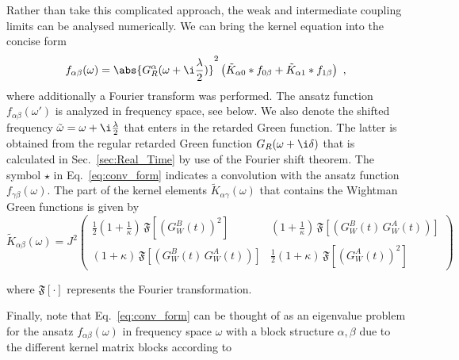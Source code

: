 Rather than take this complicated approach, the weak and intermediate coupling limits can be analysed numerically.
We can bring the kernel equation into the concise form 
%
\begin{align}
	f_{\alpha\beta}(\omega) = \abs{G^\alpha_R(\omega+\i\frac{\lambda}{2})}^2\left(\tilde{K}_{\alpha 0} \ast f_{0\beta} + \tilde{K}_{\alpha 1}\ast f_{1\beta}\right)~,
	\label{eq:conv_form}
\end{align} 
%
where additionally a Fourier transform was performed. The ansatz function $f_{\alpha\beta}(\omega')$ is analyzed in frequency space, see below.
We also denote the shifted frequency $\tilde{\omega} = \omega + \i\frac{\lambda}{2}$ that enters in the retarded Green function.
The latter is obtained from the regular retarded Green function $G_R(\omega+\i\delta)$ that is calculated in Sec.~\ref{sec:Real_Time} by use of the Fourier shift theorem.
The symbol $\star$ in Eq.~\eqref{eq:conv_form} indicates a convolution with the ansatz function $f_{\gamma\beta}(\omega)$.
The part of the kernel elements $\tilde{K}_{\alpha\gamma}(\omega)$ that contains the Wightman Green functions is given by 
%
	\begin{equation}
		\tilde{K}_{\alpha\beta}(\omega) = J^2
		\begin{pmatrix}
			\frac{1}{2} (1+\frac{1}{\kappa})\,\mathfrak{F}\left[(G^B_W(t))^2\right] & (1+\frac{1}{\kappa})\,\mathfrak{F}\left[(G^B_W(t)\,G^A_W(t))\right]  \\
			(1+\kappa)\,\mathfrak{F}\left[(G^B_W(t)\,G^A_W(t))\right]  & \frac{1}{2}(1+\kappa)\,\mathfrak{F}\left[(G^A_W(t))^2\right]
		\end{pmatrix}
	\end{equation}

%
where $\mathfrak{F}\left[ \cdot \right] $ represents the Fourier transformation.


Finally, note that Eq.~\eqref{eq:conv_form} can be thought of as an eigenvalue problem for the ansatz $f_{\alpha\beta}(\omega)$ in frequency space $\omega$ with a block structure $\alpha,\beta$ due to the different kernel matrix blocks according to 
%

